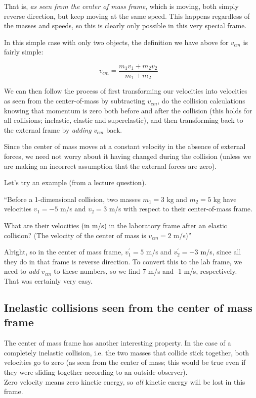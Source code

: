That is, \emph{as seen from the center of mass frame}, which is moving, both simply reverse direction, but keep moving at the same speed. This happens regardless of the masses and speeds, so this is clearly only possible in this very special frame.

In this simple case with only two objects, the definition we have above for $v_{cm}$ is fairly simple:

\begin{equation}
v_{cm} = \frac{m_1 v_1 + m_2 v_2}{m_1 + m_2}
\end{equation}

We can then follow the process of first transforming our velocities into velocities as seen from the center-of-mass by subtracting $v_{cm}$, do the collision calculations knowing that momentum is zero both before and after the collision (this holds for all collisions; inelastic, elastic and superelastic), and then transforming back to the external frame by \emph{adding} $v_{cm}$ back.

Since the center of mass moves at a constant velocity in the absence of external forces, we need not worry about it having changed during the collision (unless we are making an incorrect assumption that the external forces are zero).

Let's try an example (from a lecture question).

``Before a 1-dimensional collision, two masses $m_1 = 3$ kg and $m_2 = 5$ kg have velocities $v_1 = -5$ m/s and $v_2 = 3$ m/s with respect to their center-of-mass frame.

What are their velocities (in m/s) in the laboratory frame after an elastic collision? (The velocity of the center of mass is $v_{cm} = 2$ m/s)''

Alright, so in the center of mass frame, $v_1^{'} = 5$ m/s and $v_2^{'} = -3$ m/s, since all they do in that frame is reverse direction. To convert this to the lab frame, we need to \emph{add} $v_{cm}$ to these numbers, so we find 7 m/s and -1 m/s, respectively. That was certainly very easy.

\subsection{Inelastic collisions seen from the center of mass frame}

The center of mass frame has another interesting property. In the case of a completely inelastic collision, i.e. the two masses that collide stick together, both velocities go to zero (as seen from the center of mass; this would be true even if they were sliding together according to an outside observer).\\
Zero velocity means zero kinetic energy, so \emph{all} kinetic energy will be lost in this frame.

